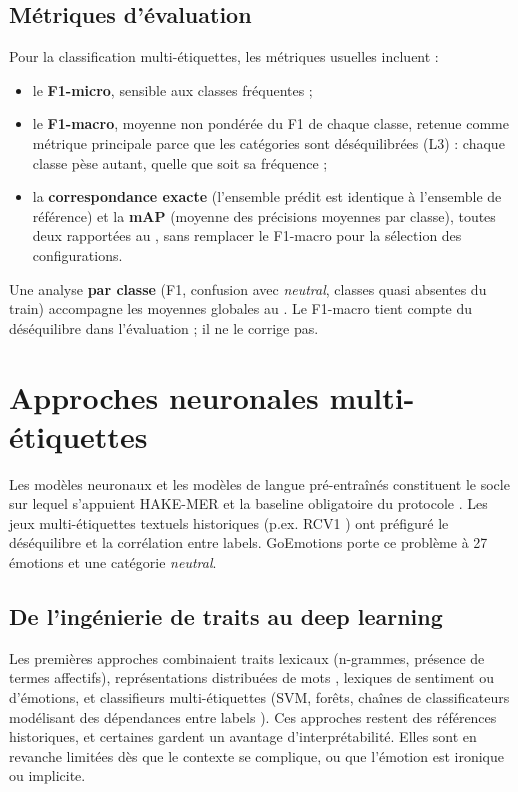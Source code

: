 \subsection{Métriques d'évaluation}

Pour la classification multi-étiquettes, les métriques usuelles
\cite{zhang2014multilabel,boutell2004multilabel,wu2021multilabelranking,bond2022multilabel}
incluent :
\begin{itemize}
\item le \textbf{F1-micro}, sensible aux classes fréquentes ;
\item le \textbf{F1-macro}, moyenne non pondérée du F1 de chaque classe,
      retenue comme métrique principale parce que les catégories sont
      déséquilibrées (L3) : chaque classe pèse autant, quelle que soit
      sa fréquence ;
\item la \textbf{correspondance exacte} (l'ensemble prédit est identique
      à l'ensemble de référence) et la \textbf{mAP} (moyenne des
      précisions moyennes par classe), toutes deux rapportées au
      , sans remplacer le F1-macro pour la
      sélection des configurations.
\end{itemize}
Une analyse \textbf{par classe} (F1, confusion avec \emph{neutral},
classes quasi absentes du train) accompagne les moyennes globales au
. Le F1-macro tient compte du déséquilibre
dans l'évaluation ; il ne le corrige pas.

\section{Approches neuronales multi-étiquettes}
\label{sec:etat-neural-multilabel}

Les modèles neuronaux et les modèles de langue pré-entraînés
constituent le socle sur lequel s'appuient HAKE-MER et la baseline
obligatoire du protocole \cite{minaee2021textcls,sharma2024deeplearningmlc}.
Les jeux multi-étiquettes textuels historiques (p.ex. RCV1
\cite{lewis2004rcv1}) ont préfiguré le déséquilibre et la corrélation
entre labels. GoEmotions porte ce problème à 27 émotions et une
catégorie \emph{neutral}.

\subsection{De l'ingénierie de traits au deep learning}

Les premières approches combinaient traits lexicaux (n-grammes,
présence de termes affectifs), représentations distribuées de mots
\cite{mikolov2013word2vec,pennington2014glove}, lexiques de sentiment
ou d'émotions, et classifieurs multi-étiquettes (SVM, forêts, chaînes
de classificateurs modélisant des dépendances entre labels
\cite{read2009classifier,read2019classifier,dembczynski2012}). Ces
approches restent des références historiques, et certaines gardent un
avantage d'interprétabilité. Elles sont en revanche limitées dès que le
contexte se complique, ou que l'émotion est ironique ou implicite.

